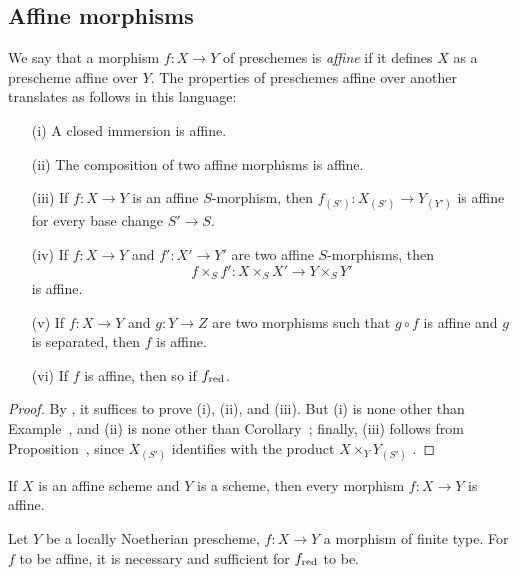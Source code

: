 \subsection{Affine morphisms}
\label{subsection:II.1.6}

\begin{env}[1.6.1]
\label{II.1.6.1}
We say that a morphism $f:X\to Y$ of preschemes is \emph{affine} if it defines $X$ as a prescheme affine over $Y$.
The properties of preschemes affine over another translates as follows in this language:
\end{env}

\begin{proposition}[1.6.2]
\label{II.1.6.2}
\medskip\noindent
\begin{enumerate}
  \item[{\rm(i)}] A closed immersion is affine.
  \item[{\rm(ii)}] The composition of two affine morphisms is affine.
  \item[{\rm(iii)}] If $f:X\to Y$ is an affine $S$-morphism, then $f_{(S')}:X_{(S')}\to Y_{(Y')}$ is affine for every base change $S'\to S$.
  \item[{\rm(iv)}] If $f:X\to Y$ and $f':X'\to Y'$ are two affine $S$-morphisms, then
    \[
      f\times_S f':X\times_S X'\to Y\times_S Y'
    \]
    is affine.
  \item[{\rm(v)}] If $f:X\to Y$ and $g:Y\to Z$ are two morphisms such that $g\circ f$ is affine and $g$ is separated, then $f$ is affine.
  \item[{\rm(vi)}] If $f$ is affine, then so if $f_{\mathrm{red}}$.
\end{enumerate}
\end{proposition}

\begin{proof}
By , it suffices to prove (i), (ii), and (iii).
But (i) is none other than Example~, and (ii) is none other than Corollary~; finally, (iii) follows from Proposition~, since $X_{(S')}$ identifies with the product $X\times_Y Y_{(S')}$ .
\end{proof}

\begin{corollary}[1.6.3]
\label{II.1.6.3}
If $X$ is an affine scheme and $Y$ is a scheme, then every morphism $f:X\to Y$ is affine.
\end{corollary}

\begin{proposition}[1.6.4]
\label{II.1.6.4}
Let $Y$ be a locally Noetherian prescheme, $f:X\to Y$ a morphism of finite type.
For $f$ to be affine, it is necessary and sufficient for $f_{\mathrm{red}}$ to be.
\end{proposition}

